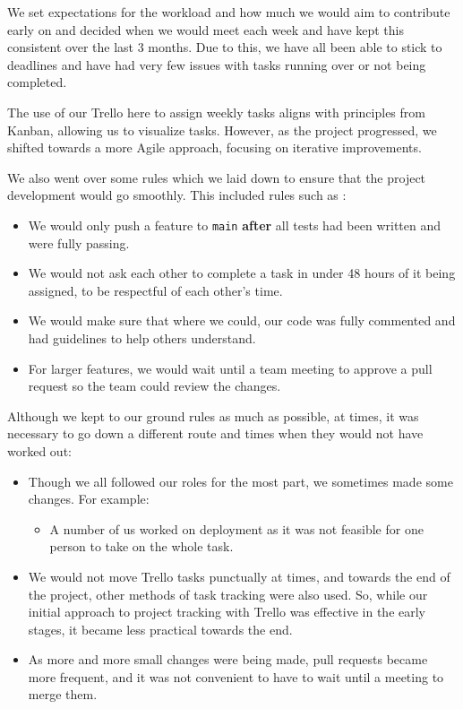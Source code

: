 We set expectations for the workload and how much we would aim to contribute early on and decided when we would meet each week and have kept this consistent over the last 3 months. Due to this, we have all been able to stick to deadlines and have had very few issues with tasks running over or not being completed.

The use of our Trello here to assign weekly tasks aligns with principles from Kanban, allowing us to visualize tasks. However, as the project progressed, we shifted towards a more Agile approach, focusing on iterative improvements.

We also went over some rules which we laid down to ensure that the project development would go smoothly. This included rules such as :

\begin{itemize}
    \item We would only push a feature to \texttt{main} \textbf{after} all tests had been written and were fully passing.
    \item We would not ask each other to complete a task in under 48 hours of it being assigned, to be respectful of each other's time.
    \item We would make sure that where we could, our code was fully commented and had guidelines to help others understand.
    \item For larger features, we would wait until a team meeting to approve a pull request so the team could review the changes.
\end{itemize}


Although we kept to our ground rules as much as possible, at times, it was necessary to go down a different route and times when they would not have worked out:

\begin{itemize}
    \item Though we all followed our roles for the most part, we sometimes made some changes. For example:
    \begin{itemize}
        \item A number of us worked on deployment as it was not feasible for one person to take on the whole task.
    \end{itemize}
    \item We would not move Trello tasks punctually at times, and towards the end of the project, other methods of task tracking were also used.  
    So, while our initial approach to project tracking with Trello was effective in the early stages, it became less practical towards the end. 
    \item As more and more small changes were being made, pull requests became more frequent, and it was not convenient to have to wait until a meeting to merge them.
\end{itemize}

